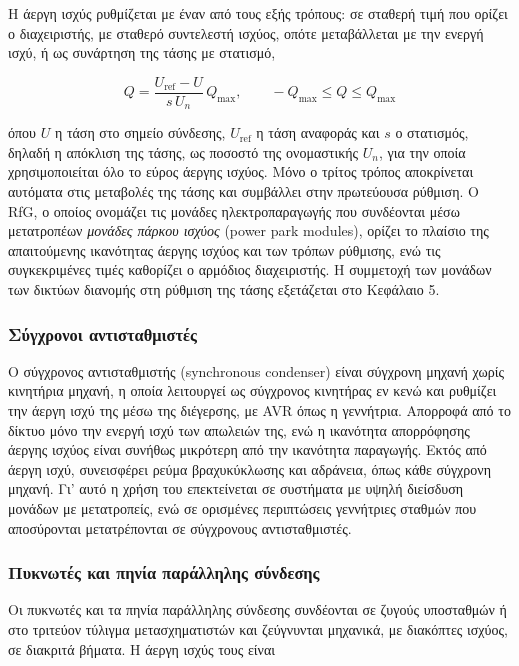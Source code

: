 Η άεργη ισχύς ρυθμίζεται με έναν από τους εξής τρόπους: σε σταθερή τιμή που ορίζει ο
διαχειριστής, με σταθερό συντελεστή ισχύος, οπότε μεταβάλλεται με την ενεργή ισχύ, ή ως
συνάρτηση της τάσης με στατισμό,

\begin{equation}
Q = \frac{U_{\mathrm{ref}} - U}{s\,U_n}\,Q_{\max}, \qquad -Q_{\max} \le Q \le Q_{\max}
\label{eq:qu}
\end{equation}

όπου $U$ η τάση στο σημείο σύνδεσης, $U_{\mathrm{ref}}$ η τάση αναφοράς και $s$ ο στατισμός,
δηλαδή η απόκλιση της τάσης, ως ποσοστό της ονομαστικής $U_n$, για την οποία
χρησιμοποιείται όλο το εύρος άεργης ισχύος. Μόνο ο τρίτος τρόπος αποκρίνεται αυτόματα στις
μεταβολές της τάσης και συμβάλλει στην πρωτεύουσα ρύθμιση. Ο RfG, ο οποίος ονομάζει τις
μονάδες ηλεκτροπαραγωγής που συνδέονται μέσω μετατροπέων \emph{μονάδες πάρκου ισχύος} (power
park modules), ορίζει το πλαίσιο της απαιτούμενης ικανότητας άεργης ισχύος και των τρόπων
ρύθμισης, ενώ τις συγκεκριμένες τιμές καθορίζει ο αρμόδιος διαχειριστής. Η συμμετοχή των μονάδων των δικτύων διανομής στη ρύθμιση
της τάσης εξετάζεται στο Κεφάλαιο 5.

\subsubsection{Σύγχρονοι αντισταθμιστές}

Ο σύγχρονος αντισταθμιστής (synchronous condenser) είναι σύγχρονη μηχανή χωρίς κινητήρια
μηχανή, η οποία λειτουργεί ως σύγχρονος κινητήρας εν κενώ και ρυθμίζει την άεργη ισχύ της
μέσω της διέγερσης, με AVR όπως η γεννήτρια. Απορροφά από το δίκτυο μόνο την ενεργή ισχύ των
απωλειών της, ενώ η ικανότητα απορρόφησης άεργης ισχύος είναι συνήθως μικρότερη από την
ικανότητα παραγωγής. Εκτός από άεργη ισχύ, συνεισφέρει ρεύμα βραχυκύκλωσης και αδράνεια,
όπως κάθε σύγχρονη μηχανή. Γι' αυτό η χρήση του επεκτείνεται σε συστήματα με υψηλή διείσδυση
μονάδων με μετατροπείς, ενώ σε ορισμένες περιπτώσεις γεννήτριες σταθμών που αποσύρονται
μετατρέπονται σε σύγχρονους αντισταθμιστές.

\subsubsection{Πυκνωτές και πηνία παράλληλης σύνδεσης}

Οι πυκνωτές και τα πηνία παράλληλης σύνδεσης συνδέονται σε ζυγούς υποσταθμών ή στο τριτεύον
τύλιγμα μετασχηματιστών και ζεύγνυνται μηχανικά, με διακόπτες ισχύος, σε διακριτά βήματα. Η
άεργη ισχύς τους είναι

